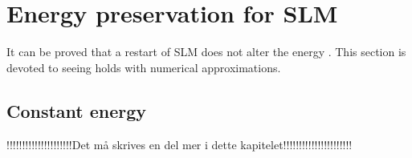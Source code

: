 \section{Energy preservation for SLM }%
It can be proved that a restart of SLM does not alter the energy \cite{luli}. This section is devoted to seeing holds with numerical approximations. \\



\subsection{Constant energy} \label{sec:SLMconstant}%
!!!!!!!!!!!!!!!!!!!!!Det må skrives en del mer i dette kapitelet!!!!!!!!!!!!!!!!!!!!!!\\

